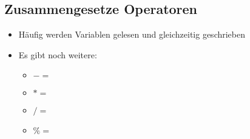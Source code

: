 \subsection{Zusammengesetze Operatoren}
\begin{frame}
	\slidehead

	\begin{itemize}
		\item Häufig werden Variablen gelesen und gleichzeitig geschrieben
	\end{itemize}


	\begin{itemize}
		\item Es gibt noch weitere:
		\begin{itemize}
			\item $-=$
			\item $*=$
			\item $/=$
			\item $\%=$
		\end{itemize}
	\end{itemize}
\end{frame}

\livecoding



